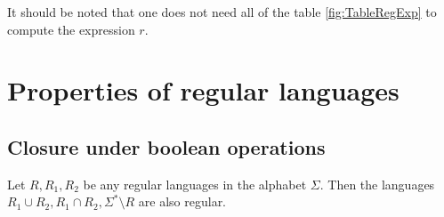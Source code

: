 \begin{page}
\begin{exl}
It should be noted that one does not need all of the table \ref{fig:TableRegExp} to compute the expression $r$.
\end{exl}

\end{page}

\begin{page}
\setcounter{section}{3}
\setcounter{subsection}{1}
\setcounter{dfn}{0}
\label{portion:985}

\section{Properties of regular languages}

\end{page}

\begin{page}
\setcounter{section}{3}
\setcounter{subsection}{1}
\setcounter{dfn}{0}
\label{portion:986}

\subsection{Closure under boolean operations}

\end{page}

\begin{page}
\setcounter{section}{3}
\setcounter{subsection}{1}
\setcounter{dfn}{1}
\label{portion:988}

\begin{thm}
\label{thm:ClosRegLang}
Let $R, R_1, R_2$ be any regular languages in the alphabet $\Sigma$.
Then the languages $R_1 \cup R_2, R_1 \cap R_2, \Sigma^* \setminus R$ are also regular.
\end{thm}

\end{page}

